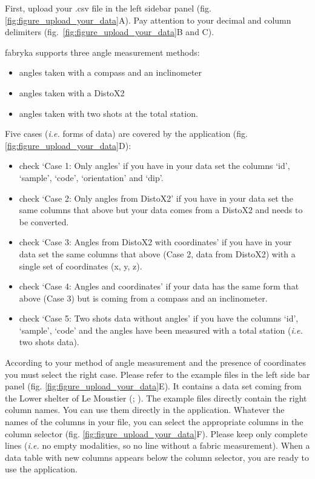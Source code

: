 \documentclass[
]{article}
\providecommand{\tightlist}{%
  \setlength{\itemsep}{0pt}\setlength{\parskip}{0pt}}
\begin{document}
First, upload your .csv file in the left sidebar panel (fig.
\ref{fig:figure_upload_your_data}A). Pay attention to your decimal and
column delimiters (fig.~\ref{fig:figure_upload_your_data}B and C).

fabryka supports three angle measurement methods:

\begin{itemize}
\tightlist
\item
  angles taken with a compass and an inclinometer
\item
  angles taken with a DistoX2
\item
  angles taken with two shots at the total station.
\end{itemize}

Five cases (\emph{i.e.} forms of data) are covered by the application
(fig. \ref{fig:figure_upload_your_data}D):

\begin{itemize}
\tightlist
\item
  check `Case 1: Only angles' if you have in your data set the columns
  `id', `sample', `code', `orientation' and `dip'.
\item
  check `Case 2: Only angles from DistoX2' if you have in your data set
  the same columns that above but your data comes from a DistoX2 and
  needs to be converted.
\item
  check `Case 3: Angles from DistoX2 with coordinates' if you have in
  your data set the same columns that above (Case 2, data from DistoX2)
  with a single set of coordinates (x, y, z).
\item
  check `Case 4: Angles and coordinates' if your data has the same form
  that above (Case 3) but is coming from a compass and an inclinometer.
\item
  check `Case 5: Two shots data without angles' if you have the columns
  `id', `sample', `code' and the angles have been measured with a total
  station (\emph{i.e.} two shots data).
\end{itemize}

According to your method of angle measurement and the presence of
coordinates you must select the right case. Please refer to the example
files in the left side bar panel (fig.
\ref{fig:figure_upload_your_data}E). It contains a data set coming from
the Lower shelter of Le Moustier (; ). The example
files directly contain the right column names. You can use them directly
in the application. Whatever the names of the columns in your file, you
can select the appropriate columns in the column selector (fig.
\ref{fig:figure_upload_your_data}F). Please keep only complete lines
(\emph{i.e.} no empty modalities, so no line without a fabric
measurement). When a data table with new columns appears below the
column selector, you are ready to use the application.
\end{document}
